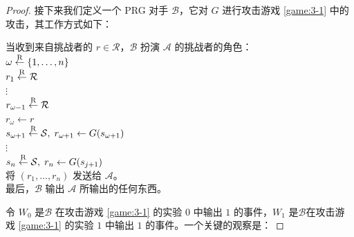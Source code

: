 \begin{proof}
接下来我们定义一个 PRG 对手 $\mathcal B$，它对 $G$ 进行攻击游戏 \ref{game:3-1} 中的攻击，其工作方式如下：

\vspace*{5pt}

\hspace*{5pt} 当收到来自挑战者的 $r\in\mathcal R$，$\mathcal B$ 扮演 $\mathcal A$ 的挑战者的角色：\\
\hspace*{50pt} $\omega\overset{\rm R}\leftarrow\{1,\dots,n\}$\\
\hspace*{50pt} $r_1\overset{\rm R}\leftarrow\mathcal R$\\
\hspace*{74pt} $\vdots$\\
\hspace*{50pt} $r_{\omega-1}\overset{\rm R}\leftarrow\mathcal R$\\
\hspace*{50pt} $r_{\omega}\leftarrow r$\\
\hspace*{50pt} $s_{\omega+1}\overset{\rm R}\leftarrow\mathcal{S},\;r_{\omega+1}\leftarrow G(s_{\omega+1})$\\
\hspace*{74pt} $\vdots$\\
\hspace*{50pt} $s_{n}\overset{\rm R}\leftarrow\mathcal{S},\;r_{n}\leftarrow G(s_{j+1})$\\
\hspace*{50pt} 将 $(r_1,\dots,r_n)$ 发送给 $\mathcal A$。\\
\hspace*{26pt} 最后，$\mathcal B$ 输出 $\mathcal A$ 所输出的任何东西。

\vspace*{5pt}

令 $W_0$ 是$\mathcal B$ 在攻击游戏 \ref{game:3-1} 的实验 $0$ 中输出 $1$ 的事件，$W_1$ 是$\mathcal B$在攻击游戏 \ref{game:3-1} 的实验 $1$ 中输出 $1$ 的事件。一个关键的观察是：


\end{proof}
